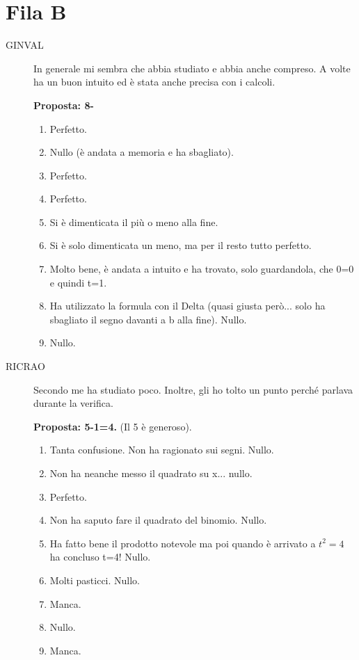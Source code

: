 \documentclass[11pt]{report}
\begin{document}
\section*{Fila B}
\begin{description}
    \item[GINVAL] In generale mi sembra che abbia studiato e abbia anche compreso. A volte ha un buon intuito ed è stata anche precisa con i calcoli.
    
    \textbf{Proposta: 8-}
    \begin{enumerate}
        \item Perfetto.
        \item Nullo (è andata a memoria e ha sbagliato).
        \item Perfetto.
        \item Perfetto.
        \item Si è dimenticata il più o meno alla fine.
        \item Si è solo dimenticata un meno, ma per il resto tutto perfetto.
        \item Molto bene, è andata a intuito e ha trovato, solo guardandola, che 0=0 e quindi t=1.
        \item Ha utilizzato la formula con il Delta (quasi giusta però... solo ha sbagliato il segno davanti a b alla fine). Nullo.
        \item Nullo.
    \end{enumerate}
\item[RICRAO] Secondo me ha studiato poco. Inoltre, gli ho tolto un punto perché parlava durante la verifica.

\textbf{Proposta: 5-1=4.} (Il 5 è generoso).
\begin{enumerate}
    \item Tanta confusione. Non ha ragionato sui segni. Nullo.
    \item Non ha neanche messo il quadrato su x... nullo.
    \item Perfetto.
    \item Non ha saputo fare il quadrato del binomio. Nullo.
    \item Ha fatto bene il prodotto notevole ma poi quando è arrivato a $t^2=4$ ha concluso t=4! Nullo.
    \item Molti pasticci. Nullo.
    \item Manca.
    \item Nullo.
    \item Manca.
\end{enumerate}


\end{description}
\end{document}
